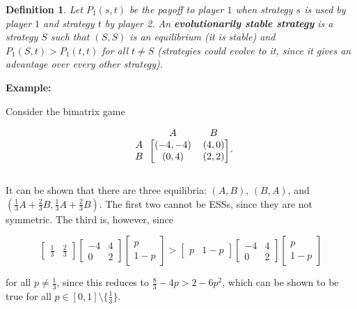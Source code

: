 \documentclass{article}
\theoremstyle{colontheorem}
\newtheorem{definition}[theorem]{Definition}
\newenvironment{Def}
{
	\begin{mdframed}[backgroundcolor=DefGreen!10]
	\begin{definition}
}
{
	\end{definition}
	\end{mdframed}
	
	\vspace{.15in}
}
\newenvironment{Example}
{
	\begin{mdframed}
	\textbf{Example:}%
}
{
	\end{mdframed}
	
	\vspace{.15in}
}
\begin{document}
\begin{Def}
	
	Let $P_1(s, t)$ be the payoff to player $1$ when strategy $s$ is used by player $1$ and strategy $t$ by player 2. An \textbf{evolutionarily stable strategy} is a strategy $S$ such that $(S, S)$ is an equilibrium (it is stable) and $P_1(S, t) > P_1(t, t)$ for all $t \neq S$ (strategies could evolve to it, since it gives an advantage over every other strategy).
	
\end{Def}



\begin{Example}
	Consider the bimatrix game
	
	$$
		\begin{blockarray}{ccc}
			& A & B\\
			\begin{block}{c[cc]}
				A & (-4, -4) & (4, 0)\\
				B & (0, 4) & (2, 2)\\
			\end{block}
		\end{blockarray}\textnormal{.}
	$$
	
	It can be shown that there are three equilibria: $(A, B)$, $(B, A)$, and $(\frac{1}{3} A + \frac{2}{3} B, \frac{1}{3} A + \frac{2}{3} B)$. The first two cannot be ESSs, since they are not symmetric. The third is, however, since
	
	$$
		\begin{bmatrix}
			\frac{1}{3} & \frac{2}{3}
		\end{bmatrix} \begin{bmatrix}
			-4 & 4\\
			0 & 2
		\end{bmatrix} \begin{bmatrix}
			p\\
			1 - p
		\end{bmatrix} > \begin{bmatrix}
			p & 1 - p
		\end{bmatrix} \begin{bmatrix}
			-4 & 4\\
			0 & 2
		\end{bmatrix} \begin{bmatrix}
			p\\
			1 - p
		\end{bmatrix}
	$$
	
	for all $p \neq \frac{1}{3}$, since this reduces to $\frac{8}{3} - 4p > 2 - 6p^2$, which can be shown to be true for all $p \in [0, 1] \setminus \{\frac{1}{3}\}$. 
	
\end{Example}
\end{document}
